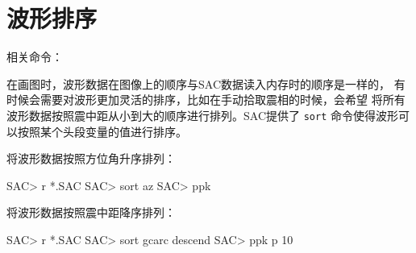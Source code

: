 \section{波形排序}
相关命令：

在画图时，波形数据在图像上的顺序与SAC数据读入内存时的顺序是一样的，
有时候会需要对波形更加灵活的排序，比如在手动拾取震相的时候，会希望
将所有波形数据按照震中距从小到大的顺序进行排列。SAC提供了 \texttt{sort}
命令使得波形可以按照某个头段变量的值进行排序。

将波形数据按照方位角升序排列：
\begin{SACCode}
SAC> r *.SAC
SAC> sort az
SAC> ppk
\end{SACCode}

将波形数据按照震中距降序排列：
\begin{SACCode}
SAC> r *.SAC
SAC> sort gcarc descend
SAC> ppk p 10
\end{SACCode}
